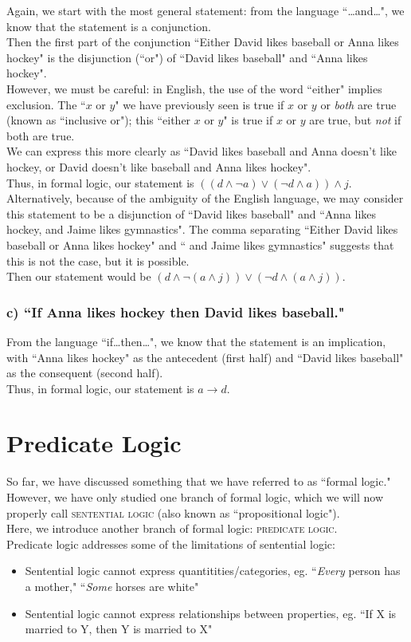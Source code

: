 \documentclass{article}
\begin{document}
Again, we start with the most general statement: from the language ``\ldots and\ldots", we know that the statement is a conjunction.\\[1ex]
Then the first part of the conjunction ``Either David likes baseball or Anna likes hockey" is the disjunction (``or") of ``David likes baseball" and ``Anna likes hockey".\\
However, we must be careful: in English, the use of the word ``either" implies exclusion. The ``$x$ or $y$" we have previously seen is true if $x$ or $y$ or \textit{both} are true (known as ``inclusive or"); this ``either $x$ or $y$" is true if $x$ or $y$ are true, but \textit{not} if both are true.\\
We can express this more clearly as ``David likes baseball and Anna doesn't like hockey, or David doesn't like baseball and Anna likes hockey".\\[1ex]
Thus, in formal logic, our statement is $((d\wedge\neg a)\vee(\neg d\wedge a))\wedge j$.\\[1ex]
Alternatively, because of the ambiguity of the English language, we may consider this statement to be a disjunction of ``David likes baseball" and ``Anna likes hockey, and Jaime likes gymnastics". The comma separating ``Either David likes baseball or Anna likes hockey" and `` and Jaime likes gymnastics" suggests that this is not the case, but it is possible.\\
Then our statement would be $(d\wedge\neg(a\wedge j))\vee(\neg d\wedge(a\wedge j))$.

\subsubsection*{c) ``If Anna likes hockey then David likes baseball."}

From the language ``if\ldots then\ldots", we know that the statement is an implication, with ``Anna likes hockey" as the antecedent (first half) and ``David likes baseball" as the consequent (second half).\\[1ex]
Thus, in formal logic, our statement is $a\to d$.

\section{\sc Predicate Logic}
So far, we have discussed something that we have referred to as ``formal logic." However, we have only studied one branch of formal logic, which we will now properly call \textsc{sentential logic} (also known as ``propositional logic").\\[1ex]
Here, we introduce another branch of formal logic: \textsc{predicate logic}.\\[1em]
Predicate logic addresses some of the limitations of sentential logic:
\begin{itemize}
\item Sentential logic cannot express quantitities/categories, eg. ``\textit{Every} person has a mother," ``\textit{Some} horses are white"
\item Sentential logic cannot express relationships between properties, eg. ``If X is married to Y, then Y is married to X"
\end{itemize}
\end{document}
